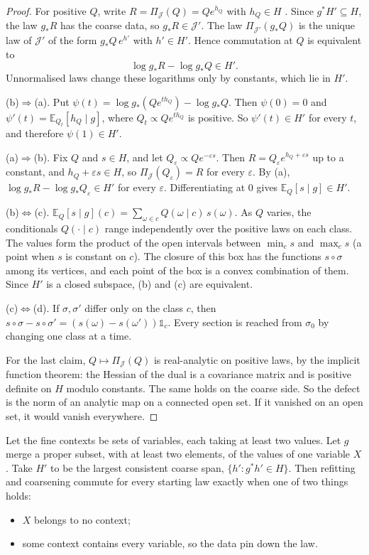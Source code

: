 \documentclass[11pt]{article}
\theoremstyle{definition}\newtheorem{definition}[theorem]{Definition}\newtheorem{remark}[theorem]{Remark}\newtheorem{example}[theorem]{Example}\newtheorem{problem}[theorem]{Open problem}\crefname{problem}{Problem}{Problems}
\begin{document}
\begin{proof}
For positive $Q$, write $R=\Pi_{\mathcal J}(Q)=Qe^{h_Q}$ with $h_Q\in H$ \cite{Csiszar1975}. Since $g^*H'\subseteq H$, the law $g_*R$ has the coarse data, so $g_*R\in\mathcal J'$. The law $\Pi_{\mathcal J'}(g_*Q)$ is the unique law of $\mathcal J'$ of the form $g_*Q\,e^{h'}$ with $h'\in H'$. Hence commutation at $Q$ is equivalent to
\[
\log g_*R-\log g_*Q\in H'.
\]
Unnormalised laws change these logarithms only by constants, which lie in $H'$.

(b)$\Rightarrow$(a). Put $\psi(t)=\log g_*(Qe^{th_Q})-\log g_*Q$. Then $\psi(0)=0$ and $\psi'(t)=\mathbb E_{Q_t}[h_Q\mid g]$, where $Q_t\propto Qe^{th_Q}$ is positive. So $\psi'(t)\in H'$ for every $t$, and therefore $\psi(1)\in H'$.

(a)$\Rightarrow$(b). Fix $Q$ and $s\in H$, and let $Q_\varepsilon\propto Qe^{-\varepsilon s}$. Then $R=Q_\varepsilon e^{h_Q+\varepsilon s}$ up to a constant, and $h_Q+\varepsilon s\in H$, so $\Pi_{\mathcal J}(Q_\varepsilon)=R$ for every $\varepsilon$. By (a), $\log g_*R-\log g_*Q_\varepsilon\in H'$ for every $\varepsilon$. Differentiating at $0$ gives $\mathbb E_Q[s\mid g]\in H'$.

(b)$\Leftrightarrow$(c). $\mathbb E_Q[s\mid g](c)=\sum_{\omega\in c}Q(\omega\mid c)\,s(\omega)$. As $Q$ varies, the conditionals $Q(\cdot\mid c)$ range independently over the positive laws on each class. The values form the product of the open intervals between $\min_cs$ and $\max_cs$ (a point when $s$ is constant on $c$). The closure of this box has the functions $s\circ\sigma$ among its vertices, and each point of the box is a convex combination of them. Since $H'$ is a closed subspace, (b) and (c) are equivalent.

(c)$\Leftrightarrow$(d). If $\sigma,\sigma'$ differ only on the class $c$, then $s\circ\sigma-s\circ\sigma'=(s(\omega)-s(\omega'))\mathbb 1_c$. Every section is reached from $\sigma_0$ by changing one class at a time.

For the last claim, $Q\mapsto\Pi_{\mathcal J}(Q)$ is real-analytic on positive laws, by the implicit function theorem: the Hessian of the dual is a covariance matrix and is positive definite on $H$ modulo constants. The same holds on the coarse side. So the defect is the norm of an analytic map on a connected open set. If it vanished on an open set, it would vanish everywhere.
\end{proof}

\begin{corollary}\label{cor:refitcommute}
Let the fine contexts be sets of variables, each taking at least two values. Let $g$ merge a proper subset, with at least two elements, of the values of one variable $X$. Take $H'$ to be the largest consistent coarse span, $\{h':g^*h'\in H\}$. Then refitting and coarsening commute for every starting law exactly when one of two things holds:
\begin{itemize}
\item $X$ belongs to no context;
\item some context contains every variable, so the data pin down the law.
\end{itemize}
\end{corollary}
\end{document}

